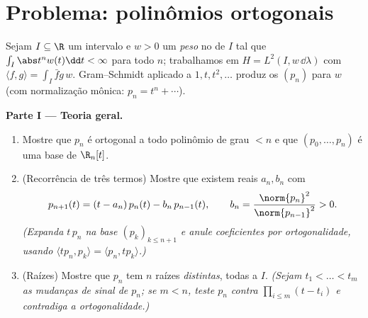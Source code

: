 \section{Problema: polinômios ortogonais}

\begin{problem}\label{pb:b3:hilbert:1}
Sejam $I \subseteq \R$ um intervalo e $w > 0$ um \emph{peso}  no
 de $I$ tal que $\int_I
\abs t^nw(t)\dd t < \infty$ para todo $n$; trabalhamos em
$H = L^2(I,
w\,\dd\lambda)$ com $\langle f, g\rangle = \int_I \bar
fg\,w$. Gram--Schmidt aplicado a $1, t, t^2, \dots$ produz os
\emph{} $(p_n)$ para $w$ (com normalização
mônica: $p_n = t^n + \cdots$).

\medskip
\noindent\textbf{Parte I --- Teoria geral.}
\begin{enumerate}
  \item Mostre que $p_n$ é ortogonal a todo polinômio de grau
        $< n$ e que $(p_0, \dots, p_n)$ é uma base de $\R_n[t]$.
  \item (Recorrência de três termos) Mostre que existem reais $a_n,
        b_n$ com
        \[
        p_{n+1}(t) = (t - a_n)\,p_n(t) - b_n\,p_{n-1}(t),
        \qquad b_n = \frac{\norm{p_n}^2}{\norm{p_{n-1}}^2} >
        0 .
        \]
        \emph{(Expanda $t\,p_n$ na base $(p_k)_{k \leq
        n+1}$ e anule coeficientes
        por ortogonalidade, usando $\langle tp_n, p_k\rangle = \langle p_n,
        tp_k\rangle$.)}
  \item (Raízes) Mostre que $p_n$ tem $n$ raízes \emph{distintas},
        todas  a $I$. \emph{(Sejam $t_1 < \dots < t_m$ as mudanças de
        sinal  de $p_n$; se $m < n$, teste $p_n$
        contra $\prod_{i\leq m}(t - t_i)$ e contradiga a ortogonalidade.)}
\end{enumerate}


\end{problem}
